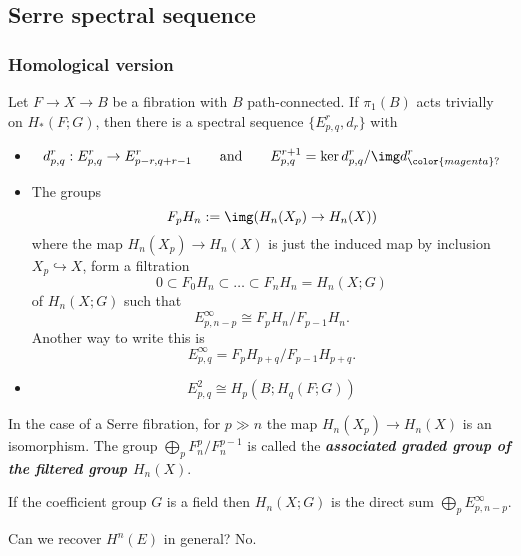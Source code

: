 \begin{remark}
\begin{definition}
\subsection{Serre spectral sequence}

\subsubsection{Homological version}

\begin{thm}
	Let $F\to X\to B$ be a fibration with $B$ path-connected. If $\pi_1(B)$ acts trivially on $H_*(F;G)$, then there is a spectral sequence $\{E^r_{p,q},d_r\}$ with
	\begin{itemize}
		\item
			$$d^r_{p,q}:E^r_{p,q}\to E^r_{p-r,q+r-1}\qquad \text{and} \qquad E^{r+1}_{p,q}=\ker d^r_{p,q}/\img d^r_{{\color{magenta}?}}$$
		\item The groups
			$$F_pH_n:=\img(H_n(X_p)\to H_n(X))$$
		where the map $H_{n}(X_p)\to H_{n}(X)$ is just the induced map by inclusion $X_p\hookrightarrow X$, form a filtration
		$$0\subset F_0H_n\subset \ldots\subset F_nH_n=H_n(X;G)$$
		of $H_n(X;G)$ such that
		$$E^\infty_{p,n-p}\cong F_pH_n/F_{p-1}H_n.$$
		Another way to write this is
		$$E_{p,q}^\infty=F_pH_{p+q}\Big/F_{p-1}H_{p+q}.$$
	\item $$E^2_{p,q}\cong H_p(B;H_q(F;G))$$
\end{itemize}
\end{thm}

\begin{remark}
	In the case of a Serre fibration, for $p\gg n$ the map $H_{n}(X_p)\to H_{n}(X)$ is an isomorphism. The group $\bigoplus_{p}F^p_n/F^{p-1}_n$ is called the \textit{\textbf{associated graded group of the filtered group $H_n(X)$}}.
\end{remark}

\begin{remark}
	If the coefficient group $G$ is a field then $H_{n}(X;G)$ is the direct sum $\bigoplus_{p} E^\infty_{p,n-p}$.
\end{remark}

\begin{question}
	Can we recover $H^{n}(E)$ in general? No.
\end{question}


\end{definition}
\end{remark}
